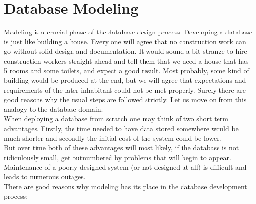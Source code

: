 \section{Database Modeling}
\label{chap:database_modeling}

Modeling is a crucial phase of the database design process.
Developing a database is just like building a house. 
Every one will agree that no construction work can go without solid design and documentation. 
It would sound a bit strange to hire construction workers straight ahead and tell them that we need a house that has 5 rooms and some toilets, and expect a good result. Most probably, some kind of building would be produced at the end, but we will agree that expectations and requirements of the later inhabitant could not be met properly.
Surely there are good reasons why the usual steps are followed strictly.
Let us move on from this analogy to the database domain. \\
When deploying a database from scratch one may think of two short term advantages. Firstly, the time needed to have data stored somewhere would be much shorter and secondly the initial cost of the system could be lower. \\
But over time both of these advantages will most likely, if the database is not ridiculously small, get outnumbered by problems that will begin to appear. Maintenance of a poorly designed system (or not designed at all) is difficult and leads to numerous outages.\\

There are good reasons why modeling has its place in the database development process:

